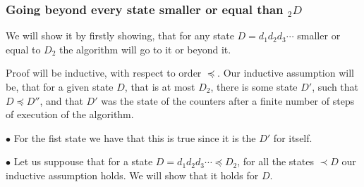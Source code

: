 \subsubsection{Going beyond every state smaller or equal than $_2D$}\label{going beyond}
We will show it by firstly showing, that for any state $D = d_1d_2d_3\cdots$ smaller 
or equal to  
$D_2$ the algorithm will go to it or beyond it.

Proof will be inductive, with respect to order $\preceq$. Our inductive assumption will be, that 
for a given state $D$, that is at most $D_2$, 
there is some state $D'$, such 
that $D\preceq D''$, and that $D'$ was the state of the counters after a finite 
number of steps of execution of the algorithm. 

$\bullet$ For the fist state we have that this is true since it is the $D'$ for itself.

$\bullet$ Let us suppouse that for a state $D = d_1d_2d_3\cdots \preceq D_2$, for  
all the states $\prec D$ our inductive assumption holds. We will show that it holds 
for $D$. 
 
